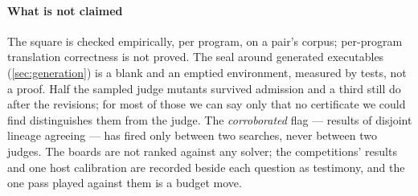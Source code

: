 \paragraph{What is not claimed}
The square is checked empirically, per program, on a pair's corpus;
per-program translation correctness is not proved. The seal around
generated executables (\cref{sec:generation}) is a blank  and an emptied
environment, measured by tests, not a proof. Half the sampled judge
mutants survived admission and a third still do after the revisions;
for most of those we can say only that no certificate we could find
distinguishes them from the judge. The \emph{corroborated} flag ---
results of disjoint lineage agreeing --- has fired only between two
searches, never between two judges. The
boards are not ranked against any solver; the competitions' results
and one host calibration are recorded beside each question as
testimony, and the one pass played against them is a budget move.
